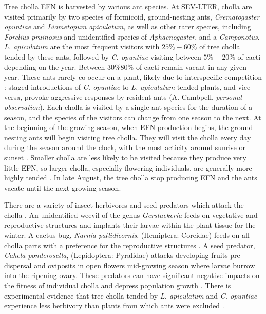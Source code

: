 \documentclass[11pt]{article}
\begin{document}
Tree cholla EFN is harvested by various ant species. 
At SEV-LTER, cholla are visited primarily by two species of formicoid, ground-nesting ants, \textit{Crematogaster opuntiae} and \textit{Liometopum apiculatum}, as well as other rarer species, including \textit{Forelius pruinosus} and unidentified species of \textit{Aphaenogaster}, and a \textit{Camponotus}.
\textit{L. apiculatum} are the most frequent visitors with $25\% - 60\%$ of tree cholla tended by these ants, followed by \textit{C. opuntiae} visiting between $5\% - 20\%$ of cacti \citep{Donald2022} depending on the year. Between $ 30\% 80\%$ of cacti remain vacant in any given year. 
These ants rarely co-occur on a plant, likely due to interspecific competition \citep{Miller2007}: staged introductions of \textit{C. opuntiae} to \textit{L. apiculatum}-tended plants, and vice versa, provoke aggressive responses by resident ants (A. Cambpell, \textit{personal observation}).
Each cholla is visited by a single ant species for the duration of a season, and the species of the visitors can change from one season to the next. 
At the beginning of the growing season, when EFN production begins, the ground-nesting ants will begin visiting tree cholla.
They will visit the cholla every day during the season around the clock, with the most acticity around sunrise or sunset \citep{Ohm2014}. 
Smaller cholla are less likely to be visited because they produce very little EFN, so larger cholla, especially flowering individuals, are generally more highly tended \citep{Miller2014}. 
In late August, the tree cholla stop producing EFN and the ants vacate until the next growing season. 

There are a variety of insect herbivores and seed predators which attack the cholla \citep{Mann1969}. 
An unidentified weevil of the genus \textit{Gerstaekeria} feeds on vegetative and reproductive structures and implants their larvae within the plant tissue for the winter. 
A cactus bug, \textit{Narnia pallidicornis}, (Hemiptera: Coreidae) feeds on all cholla parts with a preference for the reproductive structures \citep{Miller2006}.
A seed predator, \textit{Cahela ponderosella}, (Lepidoptera: Pyralidae) attacks developing fruits pre-dispersal and oviposits in open flowers mid-growing season where larvae burrow into the ripening ovary. 
These predators can have significant negative impacts on the fitness of individual cholla and depress population growth \citep{Miller2009}.
There is experimental evidence that tree cholla tended by \textit{L. apiculatum} and \textit{C. opuntiae} experience less herbivory than plants from which ants were excluded \citep{Miller2007}. 
\end{document}
